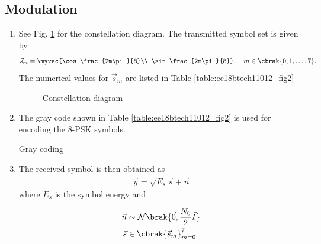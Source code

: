 \subsection{Modulation}
\begin{enumerate}[label=\thesubsection.\arabic*.,ref=\thesubsection.\theenumi]



\item See Fig. \ref{fig:ee18btech11012_fig1} for the constellation diagram.  The transmitted symbol set is given by 
\begin{align}
\vec{s}_m = \myvec{\cos \frac{2m\pi}{8}\\ \sin \frac{2m\pi}{8}}, \quad m \in \cbrak{0,1,\dots,7}.
\end{align}
%
The numerical values for $\vec{s}_m$ are listed in Table \ref{table:ee18btech11012_fig2}
\begin{figure}[!ht]
                \resizebox{\columnwidth}{!}{}
\caption{Constellation diagram}
\label{fig:ee18btech11012_fig1}
\end{figure}


\item The gray code shown in Table \ref{table:ee18btech11012_fig2}
 is used for encoding the 8-PSK symbols.
\begin{table}[!ht]
                \resizebox{\columnwidth}{!}{}
\caption{Gray coding}
\label{table:ee18btech11012_fig2}
\end{table}


\item The received symbol is then obtained as
\begin{align}
\vec{y} = \sqrt{E_s}\vec{s} + \vec{n}
\end{align}
%
where $E_s$ is the symbol energy and 

\begin{align}
\vec{n} &\sim \mathcal{N}\brak{\vec{0},\frac{N_0}{2}\vec{I}}
\\
\vec{s} &\in \cbrak{\vec{s}_m}_{m = 0}^{7}
\end{align}


\end{enumerate}
